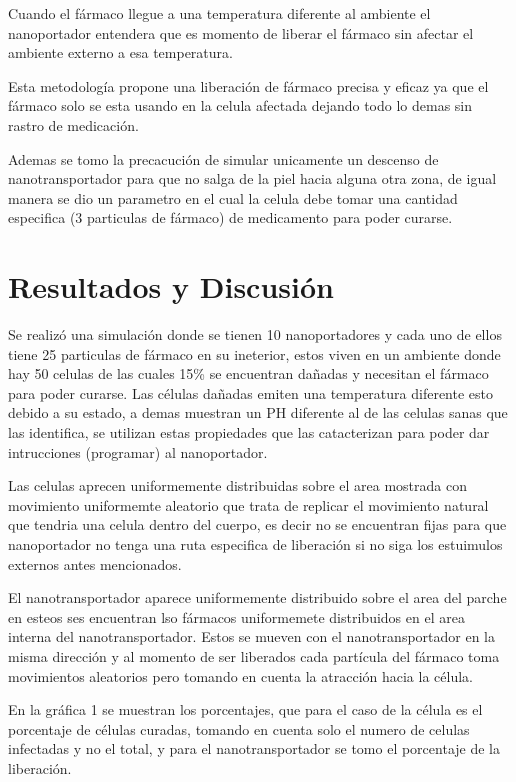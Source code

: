 \documentclass[a4paper,fleqn]{cas-sc}
\begin{document}
Cuando el fármaco llegue a una temperatura diferente al ambiente el nanoportador entendera que es momento de liberar el fármaco sin afectar el ambiente externo a esa temperatura.

Esta metodología propone una liberación de fármaco precisa y eficaz ya que el fármaco solo se esta usando en la celula afectada dejando todo lo demas sin rastro de medicación.

Ademas se tomo la precacución de simular unicamente un descenso de nanotransportador para que no salga de la piel hacia alguna otra zona, de igual manera se dio un parametro en el cual la celula debe tomar una cantidad especifica (3 particulas de fármaco) de medicamento para poder curarse. 


\section{Resultados y Discusión}
Se realizó una simulación donde se tienen 10 nanoportadores y cada uno de ellos tiene 25 particulas de fármaco en su ineterior, estos viven en un ambiente donde hay 50 celulas de las cuales 15\% se encuentran dañadas y necesitan el fármaco para poder curarse. Las células dañadas emiten una temperatura diferente esto debido a su estado, a demas muestran un PH diferente al de las celulas sanas que las identifica, se utilizan estas propiedades que las catacterizan para poder dar intrucciones (programar)  al nanoportador.

 Las celulas aprecen uniformemente distribuidas sobre el area mostrada con movimiento uniformemte aleatorio que trata de replicar el movimiento natural que tendria una celula dentro del cuerpo, es decir no se encuentran fijas para que nanoportador no tenga una ruta especifica de liberación si no siga los estuimulos externos antes mencionados. 

El nanotransportador aparece uniformemente distribuido sobre el area del parche en esteos ses encuentran lso fármacos uniformemete distribuidos en el area interna del nanotransportador. Estos se mueven con el nanotransportador en la misma dirección y al momento de ser liberados cada partícula del fármaco toma movimientos aleatorios pero tomando en cuenta la atracción hacia la célula. 

En la gráfica 1 se muestran los porcentajes, que para el caso de la célula es el porcentaje de células curadas, tomando en cuenta solo el numero de celulas infectadas y no el total, y para el nanotransportador se tomo el porcentaje de la liberación.
\end{document}
